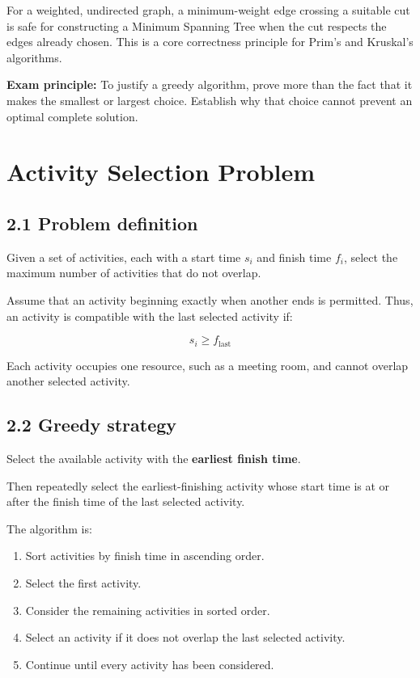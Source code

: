 For a weighted, undirected graph, a minimum-weight edge crossing a suitable cut is safe for constructing a Minimum Spanning Tree when the cut respects the edges already chosen. This is a core correctness principle for Prim's and Kruskal's algorithms.

\textbf{Exam principle:} To justify a greedy algorithm, prove more than the fact that it makes the smallest or largest choice. Establish why that choice cannot prevent an optimal complete solution.

\section{Activity Selection Problem}

\subsection{2.1 Problem definition}

Given a set of activities, each with a start time $s_i$ and finish time $f_i$, select the maximum number of activities that do not overlap.

Assume that an activity beginning exactly when another ends is permitted. Thus, an activity is compatible with the last selected activity if:


\[
s_i\geq f_{\text{last}}
\]


Each activity occupies one resource, such as a meeting room, and cannot overlap another selected activity.

\subsection{2.2 Greedy strategy}

Select the available activity with the \textbf{earliest finish time}.

Then repeatedly select the earliest-finishing activity whose start time is at or after the finish time of the last selected activity.

The algorithm is:

\begin{enumerate}
    \item Sort activities by finish time in ascending order.
    \item Select the first activity.
    \item Consider the remaining activities in sorted order.
    \item Select an activity if it does not overlap the last selected activity.
    \item Continue until every activity has been considered.
\end{enumerate}

